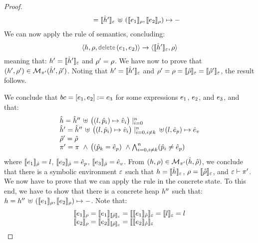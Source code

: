 \begin{proof}
$$\begin{array}{l}
         \qquad = \semexpr{\sheap'}{\senv} \dunion (\symbeval{\jsilexpr_1}{\store}, \symbeval{\jsilexpr_2}{\store}) \mapsto -
\end{array}
$$
We can now apply the  rule of \jsil semantics, concluding: 
$$
   \semtrans{\heap, \store, \jsildelete(\jsilexpr_1, \jsilexpr_2)}{\semexpr{\sheap'}{\senv},  \store}
$$
meaning that: $\heap' = \semexpr{\sheap'}{\senv}$ and $\store' = \store$.
We have now to prove that $(\heap', \store') \in \smodels{\sheap', \sstore'}{\pc'}$.
Noting that $\heap' = \semexpr{\sheap'}{\senv}$ and $\store' = \store = \semexpr{\sstore}{\senv} = \semexpr{\sstore'}{\senv}$, 
the result follows. 
\vspace{6pt}

\noindent{}
We conclude that  $\bcmd = [\jsilexpr_1, \jsilexpr_2] := \jsilexpr_3$ for some expressions $\jsilexpr_1$, $\jsilexpr_2$, 
and $\jsilexpr_3$, and that: 
$$
\begin{array}{l}
  \sheap =  \sheap'' \, \uplus \, \big((l, \sexprp_i) \mapsto \sexprv_i\big)\mid_{i = 0}^n    \\
  \sheap' = \sheap'' \, \uplus \,  \big((l, \sexprp_i) \mapsto \sexprv_i\big)\mid_{i = 0, i \neq k}^n \, \uplus \,  (l, \sexpr_p) \mapsto \sexpr_v  \\
  \sstore' = \sstore \\ 
  \pc' = \pc \ \wedge \, \big( (\sexprp_k = \sexpr_p) \ \wedge \bigwedge_{i = 0, i \neq k}^n (\sexprp_i \neq \sexpr_p)
\end{array}
$$ 
where $\symbeval{\jsilexpr_1}{\sstore} =  \loc$, $\symbeval{\jsilexpr_2}{\sstore} =  \sexpr_p$, 
$\symbeval{\jsilexpr_3}{\sstore} =  \sexpr_v$.
From $(\heap, \store) \in \smodels{\sheap, \sstore}{\pc'}$, we conclude that there is a symbolic environment
$\senv$ such that $\heap = \semexpr{\sheap}{\senv}$, $\store = \semexpr{\sstore}{\senv}$, and 
$\senv \vdash \pc'$. 
We now have to prove that we can apply the  rule in the concrete state.
To this end, we have to show that there is a concrete heap $\heap''$ such that:
$\heap = \heap'' \dunion \hcell{\symbeval{\jsilexpr_1}{\store}}{\symbeval{\jsilexpr_2}{\store}}{-}$. 
Note that: 
$$
\begin{array}{l}
%
 \symbeval{\jsilexpr_1}{\store} = \symbeval{\jsilexpr_1}{\symbeval{\sstore}{\senv}} = \symbeval{\symbeval{\jsilexpr_1}{\sstore}}{\senv} 
    = \symbeval{\loc}{\senv} = \loc \\ 
  \symbeval{\jsilexpr_2}{\store}  = \symbeval{\jsilexpr_2}{\semexpr{\sstore}{\senv}} =  \symbeval{\symbeval{\jsilexpr_2}{\sstore}}{\senv}

\end{array}$$
\end{proof}
